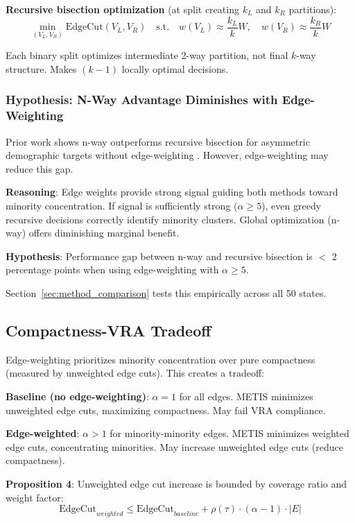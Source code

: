 \textbf{Recursive bisection optimization} (at split creating $k_L$ and $k_R$ partitions):
\begin{equation}
\min_{(V_L, V_R)} \text{EdgeCut}(V_L, V_R) \quad \text{s.t.} \quad w(V_L) \approx \frac{k_L}{k}W, \quad w(V_R) \approx \frac{k_R}{k}W
\end{equation}

Each binary split optimizes intermediate 2-way partition, not final $k$-way structure. Makes $(k-1)$ locally optimal decisions.

\subsubsection{Hypothesis: N-Way Advantage Diminishes with Edge-Weighting}

Prior work shows n-way outperforms recursive bisection for asymmetric demographic targets without edge-weighting \citep{karypis1998}. However, edge-weighting may reduce this gap.

\textbf{Reasoning}: Edge weights provide strong signal guiding both methods toward minority concentration. If signal is sufficiently strong ($\alpha \geq 5$), even greedy recursive decisions correctly identify minority clusters. Global optimization (n-way) offers diminishing marginal benefit.

\textbf{Hypothesis}: Performance gap between n-way and recursive bisection is $<$ 2 percentage points when using edge-weighting with $\alpha \geq 5$.

Section~\ref{sec:method_comparison} tests this empirically across all 50 states.

\subsection{Compactness-VRA Tradeoff}

Edge-weighting prioritizes minority concentration over pure compactness (measured by unweighted edge cuts). This creates a tradeoff:

\textbf{Baseline (no edge-weighting)}: $\alpha = 1$ for all edges. METIS minimizes unweighted edge cuts, maximizing compactness. May fail VRA compliance.

\textbf{Edge-weighted}: $\alpha > 1$ for minority-minority edges. METIS minimizes weighted edge cuts, concentrating minorities. May increase unweighted edge cuts (reduce compactness).

\textbf{Proposition 4}: Unweighted edge cut increase is bounded by coverage ratio and weight factor:
\begin{equation}
\text{EdgeCut}_{weighted} \leq \text{EdgeCut}_{baseline} + \rho(\tau) \cdot (\alpha - 1) \cdot |E|
\end{equation}

